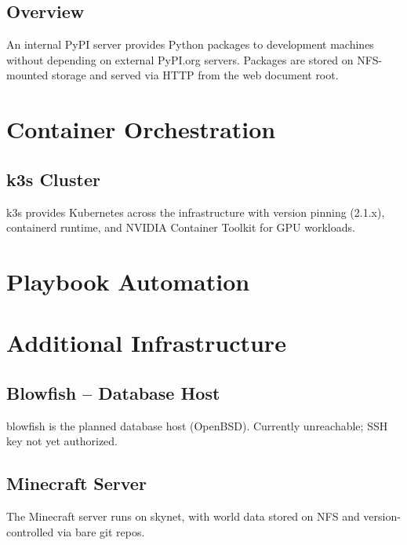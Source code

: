 \section{Overview}
An internal PyPI server provides Python packages to development machines without depending on external PyPI.org servers. Packages are stored on NFS-mounted storage and served via HTTP from the web document root.

% 


\chapter{Container Orchestration}

\section{k3s Cluster}
k3s provides Kubernetes across the infrastructure with version pinning (2.1.x), containerd runtime, and NVIDIA Container Toolkit for GPU workloads.

% 


\chapter{Playbook Automation}

% 


\chapter{Additional Infrastructure}

\section{Blowfish -- Database Host}
blowfish is the planned database host (OpenBSD). Currently unreachable; SSH key not yet authorized.

% 


\section{Minecraft Server}
The Minecraft server runs on skynet, with world data stored on NFS and version-controlled via bare git repos.

% 


